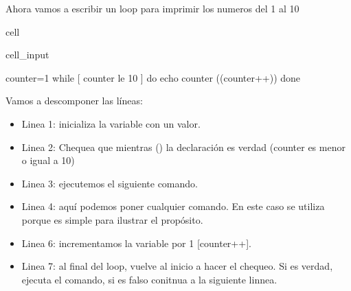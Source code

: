 \documentclass[letterpaper,10pt,english]{jupyterBook}
\begin{document}
\sphinxAtStartPar
{}

\sphinxAtStartPar
{}

\sphinxAtStartPar
{}

\sphinxAtStartPar
{}

\sphinxAtStartPar
Ahora vamos a escribir un loop para imprimir los numeros del 1 al 10

\begin{sphinxuseclass}{cell}\begin{sphinxVerbatimInput}

\begin{sphinxuseclass}{cell_input}
\begin{sphinxVerbatim}[commandchars=\\\{\}]
\PYGZdl{} counter=1
\PYGZdl{} while [ \PYGZdl{}counter \PYGZhy{}le 10 ]
\PYGZdl{} do
\PYGZdl{} echo \PYGZdl{}counter
\PYGZdl{} ((counter++))
\PYGZdl{} done
\end{sphinxVerbatim}

\end{sphinxuseclass}\end{sphinxVerbatimInput}

\end{sphinxuseclass}
\sphinxAtStartPar
Vamos a descomponer las líneas:
\begin{itemize}
\item {} 
\sphinxAtStartPar
Linea 1: inicializa la variable  con un valor.

\item {} 
\sphinxAtStartPar
Linea 2: Chequea que mientras () la declaración es verdad (counter es menor o igual a 10)

\item {} 
\sphinxAtStartPar
Linea 3: ejecutemos el siguiente comando.

\item {} 
\sphinxAtStartPar
Linea 4: aquí podemos poner cualquier comando. En este caso  se utiliza porque es simple para ilustrar el propósito.

\item {} 
\sphinxAtStartPar
Linea 6: incrementamos la variable  por 1 {[}counter++{]}.

\item {} 
\sphinxAtStartPar
Linea 7: al final del loop, vuelve al inicio a hacer el chequeo. Si es verdad, ejecuta el comando, si es falso conitnua a la siguiente linnea.

\end{itemize}
\end{document}

